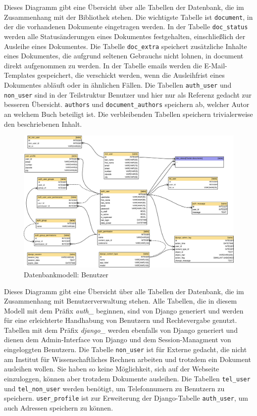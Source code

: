 Dieses Diagramm gibt eine Übersicht über alle Tabellen der Datenbank, die im
Zusammenhang mit der Bibliothek stehen. Die wichtigste Tabelle ist
\lstinline{document}, in der die vorhandenen Dokumente eingetragen werden. In
der Tabelle \lstinline{doc_status} werden alle Statusänderungen eines Dokumentes
festgehalten, einschließlich der Ausleihe eines Dokumentes. Die Tabelle
\lstinline{doc_extra} speichert zusätzliche Inhalte eines Dokumentes, die aufgrund
seltenen Gebrauchs nicht lohnen, in document direkt aufgenommen zu werden. In
der Tabelle emails werden die E-Mail-Templates gespeichert, die verschickt
werden, wenn die Ausleihfrist eines Dokumentes abläuft oder in ähnlichen
Fällen. Die Tabellen \lstinline{auth_user} und \lstinline{non_user} sind in der Teilstruktur Benutzer
und hier nur als Referenz gedacht zur besseren Übersicht. \lstinline{authors}
und \lstinline{document_authors} speichern ab, welcher Autor an welchem Buch
beteiligt ist. Die verbleibenden Tabellen speichern trivialerweise den beschriebenen Inhalt.


\begin{figure}[H]
\includegraphics[width=1.0\linewidth]{bilder/database-wirelib_cluster-user.pdf}
\caption{Datenbankmodell: Benutzer}
\label{fig:DB_UserDiagramm}
\end{figure}

Dieses Diagramm gibt eine Übersicht über alle Tabellen der Datenbank, die im
Zusammenhang mit Benutzerverwaltung stehen. Alle Tabellen, die in diesem Modell
mit dem Präfix \emph{auth\_} beginnen, sind von Django generiert und werden für
eine erleichterte Handhabung von Benutzern und Rechtevergabe genutzt. Tabellen
mit dem Präfix \emph{django\_} werden ebenfalls von Django generiert und dienen
dem Admin-Interface von Django und dem Session-Managment von eingeloggten
Benutzern. Die Tabelle \lstinline{non_user} ist für Externe gedacht, die nicht
am Institut für Wissenschaftliches Rechnen arbeiten und trotzdem ein Dokument
ausleihen wollen. Sie haben so keine Möglichkeit, sich auf der Webseite
einzuloggen, können aber trotzdem Dokumente ausleihen. Die Tabellen
\lstinline{tel_user} und \lstinline{tel_non_user} werden benötigt, um
Telefonnumern zu Benutzern zu speichern.  \lstinline{user_profile} ist zur
Erweiterung der Django-Tabelle \lstinline{auth_user}, um auch Adressen
speichern zu können.

